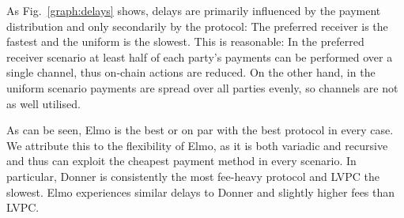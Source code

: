   As Fig.~\ref{graph:delays} shows, delays are primarily influenced by the
  payment distribution and only secondarily by the protocol: The preferred
  receiver is the fastest and the uniform is the slowest. This is reasonable:
  In the preferred receiver scenario at least half of each party's payments can
  be performed over a single channel, thus on-chain actions are reduced. On the
  other hand, in the uniform scenario payments are spread over all parties
  evenly, so channels are not as well utilised.

  As can be seen, Elmo is the best or on par with the best protocol in every
  case. We attribute this to the flexibility of Elmo, as it is both variadic and
  recursive and thus can exploit the cheapest payment method in every scenario.
  In particular, Donner is consistently the most fee-heavy protocol and LVPC the
  slowest. Elmo experiences similar delays to Donner and slightly higher fees
  than LVPC.

